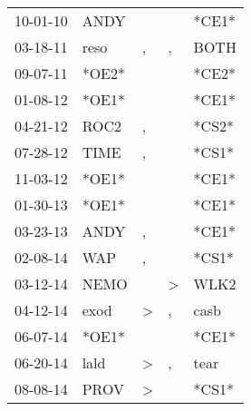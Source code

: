 \begin{supertabular}{p{0.07\textwidth}p{0.06\textwidth}p{0.02\textwidth}p{0.02\textwidth}p{0.06\textwidth}}
 10-01-10\textsuperscript{} &           ANDY\textsuperscript{} &                  &               &                            *CE1* \\
 03-18-11\textsuperscript{} &           reso\textsuperscript{} &                , &             , &           BOTH\textsuperscript{} \\
 09-07-11\textsuperscript{} &                            *OE2* &                  &               &                            *CE2* \\
 01-08-12\textsuperscript{} &                            *OE1* &                  &               &                            *CE1* \\
 04-21-12\textsuperscript{} &           ROC2\textsuperscript{} &                , &               &                            *CS2* \\
 07-28-12\textsuperscript{} &           TIME\textsuperscript{} &                , &               &                            *CS1* \\
 11-03-12\textsuperscript{} &                            *OE1* &                  &               &                            *CE1* \\
 01-30-13\textsuperscript{} &                            *OE1* &                  &               &                            *CE1* \\
 03-23-13\textsuperscript{} &           ANDY\textsuperscript{} &                , &               &                            *CE1* \\
 02-08-14\textsuperscript{} &            WAP\textsuperscript{} &                , &               &                            *CS1* \\
 03-12-14\textsuperscript{} &           NEMO\textsuperscript{} &                  &  \textgreater &           WLK2\textsuperscript{} \\
 04-12-14\textsuperscript{} &           exod\textsuperscript{} &     \textgreater &             , &           casb\textsuperscript{} \\
 06-07-14\textsuperscript{} &                            *OE1* &                  &               &                            *CE1* \\
 06-20-14\textsuperscript{} &           lald\textsuperscript{} &     \textgreater &             , &           tear\textsuperscript{} \\
 08-08-14\textsuperscript{} &           PROV\textsuperscript{} &     \textgreater &               &                            *CS1* \\

\end{supertabular}
